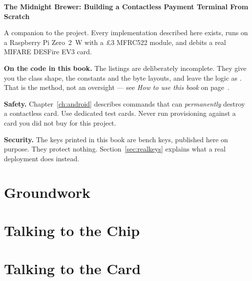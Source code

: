 \documentclass[11pt,twoside,openright]{book}
\begin{document}
\cleardoublepage

\thispagestyle{empty}
\vspace*{\fill}
{\small
\textbf{The Midnight Brewer: Building a Contactless Payment Terminal From Scratch}\par
\vspace{8pt}
A companion to the  project. Every implementation
described here exists, runs on a Raspberry Pi Zero~2~W with a \pounds3 MFRC522
module, and debits a real MIFARE DESFire EV3 card.\par
\vspace{10pt}
\textbf{On the code in this book.} The listings are deliberately incomplete.
They give you the class shape, the constants and the byte layouts, and leave
the logic as . That is the method, not an oversight --- see
\emph{How to use this book} on page~\pageref{sec:howtouse}.\par
\vspace{10pt}
\textbf{Safety.} Chapter~\ref{ch:android} describes commands that can
\emph{permanently} destroy a contactless card. Use dedicated test cards.
Never run provisioning against a card you did not buy for this project.\par
\vspace{10pt}
\textbf{Security.} The keys printed in this book are bench keys, published
here on purpose. They protect nothing. Section~\ref{sec:realkeys} explains what
a real deployment does instead.\par
}
\vspace*{\fill}

\cleardoublepage
\tableofcontents

\cleardoublepage


\mainmatter

\part{Groundwork}


\part{Talking to the Chip}



\part{Talking to the Card}




\end{document}
